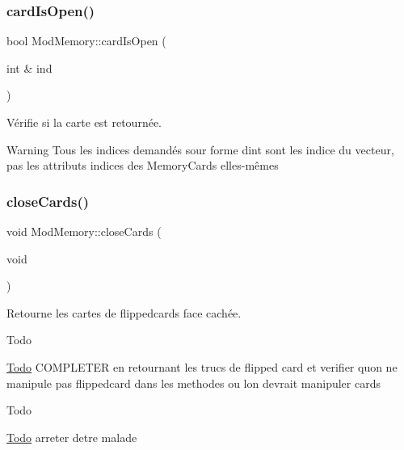 \subsubsection{\texorpdfstring{card\+Is\+Open()}{cardIsOpen()}}
{\footnotesize\ttfamily bool Mod\+Memory\+::card\+Is\+Open (\begin{DoxyParamCaption}\item[{int \&}]{ind }\end{DoxyParamCaption})}



Vérifie si la carte est retournée. 

\begin{DoxyWarning}{Warning}
Tous les indices demandés sour forme d\textquotesingle{}int sont les indice du vecteur, pas les attributs indices des Memory\+Cards elles-\/mêmes 
\end{DoxyWarning}
\mbox{\label{class_mod_memory_a4e6581fef7b3adbad429bf4c39d38e88}} 
\subsubsection{\texorpdfstring{close\+Cards()}{closeCards()}}
{\footnotesize\ttfamily void Mod\+Memory\+::close\+Cards (\begin{DoxyParamCaption}\item[{void}]{ }\end{DoxyParamCaption})}



Retourne les cartes de flippedcards face cachée. 

\begin{DoxyRefDesc}{Todo}
\item[\hyperlink{todo__todo000014}{Todo}]C\+O\+M\+P\+L\+E\+T\+ER en retournant les trucs de flipped card et verifier qu\textquotesingle{}on ne manipule pas flippedcard dans les methodes ou l\textquotesingle{}on devrait manipuler cards\end{DoxyRefDesc}


\begin{DoxyRefDesc}{Todo}
\item[\hyperlink{todo__todo000015}{Todo}]arreter d\textquotesingle{}etre malade \end{DoxyRefDesc}
\mbox{\label{class_mod_memory_a2ea383b6a13143c4f1f5fa9534e6faa6}} 
